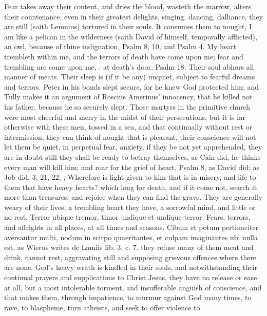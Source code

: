 {Fear takes away their content, and dries the blood, wasteth the marrow,
alters their countenance, even in their greatest delights, singing,
dancing, dalliance, they are still (saith Lemnius) tortured in
their souls. It consumes them to nought, I am like a pelican in the
wilderness (saith David of himself, temporally afflicted), an owl,
because of thine indignation, Psalm  8, 10, and Psalm  4. My
heart trembleth within me, and the terrors of death have come upon me;
fear and trembling are come upon me, \etc{}. at death's door, Psalm 
18. Their soul abhors all manner of meats. Their sleep is (if it
be any) unquiet, subject to fearful dreams and terrors. Peter in his
bonds slept secure, for he knew God protected him; and Tully makes it
an argument of Roscius Amerinus' innocency, that he killed not his
father, because he so securely slept. Those martyrs in the primitive
church were most cheerful and merry in the midst of their
persecutions; but it is far otherwise with these men, tossed in a sea,
and that continually without rest or intermission, they can think of
nought that is pleasant, their conscience will not let them be
quiet, in perpetual fear, anxiety, if they be not yet apprehended, they
are in doubt still they shall be ready to betray themselves, as Cain
did, he thinks every man will kill him; and roar for the grief of
heart, Psalm  8, as David did; as Job did,  3, 21, 22, \etc{},
Wherefore is light given to him that is in misery, and life to them
that have heavy hearts? which long for death, and if it come not,
search it more than treasures, and rejoice when they can find the
grave. They are generally weary of their lives, a trembling heart they
have, a sorrowful mind, and little or no rest. Terror ubique tremor,
timor undique et undique terror. Fears, terrors, and affrights in all
places, at all times and seasons. Cibum et potum pertinaciter
aversantur multi, nodum in scirpo quaeritantes, et culpam imaginantes
ubi nulla est, as Wierus writes de Lamiis lib. 3. c. 7. they refuse
many of them meat and drink, cannot rest, aggravating still and
supposing grievous offences where there are none. God's heavy wrath is
kindled in their souls, and notwithstanding their continual prayers and
supplications to Christ Jesus, they have no release or ease at all, but
a most intolerable torment, and insufferable anguish of conscience, and
that makes them, through impatience, to murmur against God many times,
to rave, to blaspheme, turn atheists, and seek to offer violence to
}
